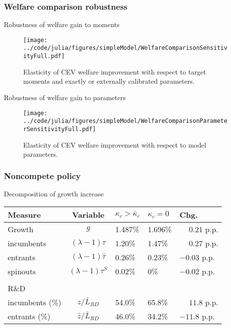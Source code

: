 \documentclass[english,usenames,dvipsnames]{beamer}
\begin{document}
\subsubsection{Welfare comparison robustness}

\begin{frame}{Robustness of welfare gain to moments}\label{robustness_to_moments}
\hyperlink{reducing_kappa_c_table}{}
	\begin{figure}
		\texttt{[image: ../code/julia/figures/simpleModel/WelfareComparisonSensitivityFull.pdf]}
		\caption{Elasticity of CEV welfare improvement with respect to target moments and exactly or externally calibrated parameters.}
		\label{WelfareComparisonSensitivityFull}
	\end{figure}
\end{frame}

\begin{frame}{Robustness of welfare gain to parameters}\label{robustness_to_parameters}
	\hyperlink{reducing_kappa_c_table}{}
	\begin{figure}
		\texttt{[image: ../code/julia/figures/simpleModel/WelfareComparisonParameterSensitivityFull.pdf]}
		\caption{Elasticity of CEV welfare improvement with respect to model parameters.}
		\label{WelfareComparisonSensitivityFull}
	\end{figure}
\end{frame}


\subsubsection{Noncompete policy}

\begin{frame}{Decomposition of growth increase}\label{decomposition_growth_increase}
	\hyperlink{reducing_kappa_c_table}{}
	\begin{table}
		\centering
		\footnotesize
		\begin{tabular}{lclll}
			\toprule \toprule
			Measure & Variable & $\kappa_c > \bar{\kappa}_c$ & $\kappa_c = 0$ & Chg. \tabularnewline
			\midrule
			Growth & $g$ & 1.487\% & 1.696\% & $\phantom{-} 0.21$ p.p.\tabularnewline
			\multicolumn{1}{l}{\quad incumbents} & $(\lambda -1) \tau$  & 1.20\% & 1.47\% & $\phantom{-}$0.27 p.p. \tabularnewline
			\multicolumn{1}{l}{\quad entrants} & $(\lambda -1) \hat{\tau}$ & 0.26\% & 0.23\% & $-0.03$ p.p. \tabularnewline
			\multicolumn{1}{l}{\quad spinouts} & $(\lambda -1) \tau^S$ & 0.02\% & 0\% & $-0.02$ p.p. \tabularnewline
			\tabularnewline
			R\&D & & & & 
			\tabularnewline
			\multicolumn{1}{l}{\quad incumbents (\%)}  & $z / \bar{L}_{RD}$ & 54.0\% & 65.8\% & $\phantom{-} 11.8$ p.p. \tabularnewline 
			
			\multicolumn{1}{l}{\quad entrants (\%)}  & $\hat{z} / \bar{L}_{RD}$ & 46.0\% & 34.2\% & $-11.8$ p.p. \tabularnewline
			\bottomrule
		\end{tabular}
	\end{table}
\end{frame}
\end{document}
